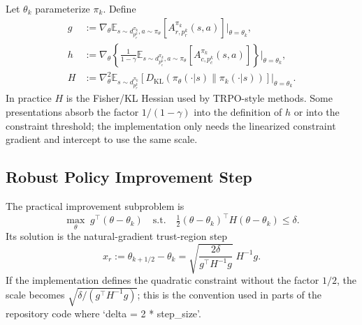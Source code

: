 \documentclass[11pt]{article}
\newcommand{\E}{\mathbb E}
\newcommand{\KL}{D_{\mathrm{KL}}}
\newcommand{\half}{\tfrac12}
\begin{document}
Let $\theta_k$ parameterize $\pi_k$.  Define
\begin{align}
    g &:= \nabla_\theta
    \E_{s\sim d_{p_r^k}^{\pi_k},a\sim\pi_\theta}
    \left[A^{\pi_k}_{r,p_r^k}(s,a)\right]\Big|_{\theta=\theta_k},
    \label{eq:g-def}\\
    h &:= \nabla_\theta
    \left\{\frac{1}{1-\gamma}\E_{s\sim d_{p_c^k}^{\pi_k},a\sim\pi_\theta}
    \left[A^{\pi_k}_{c,p_c^k}(s,a)\right]\right\}\Big|_{\theta=\theta_k},
    \label{eq:h-def}\\
    H &:= \nabla_\theta^2
    \E_{s\sim d_{p_r^k}^{\pi_k}}
    \left[\KL(\pi_\theta(\cdot|s)\|\pi_k(\cdot|s))\right]\Big|_{\theta=\theta_k}.
    \label{eq:H-def}
\end{align}
In practice $H$ is the Fisher/KL Hessian used by TRPO-style methods.  Some presentations absorb the factor $1/(1-\gamma)$ into the definition of $h$ or into the constraint threshold; the implementation only needs the linearized constraint gradient and intercept to use the same scale.

\subsection{Robust Policy Improvement Step}
The practical improvement subproblem is
\begin{equation}
    \max_\theta\; g^\top(\theta-\theta_k)
    \quad\text{s.t.}\quad
    \half(\theta-\theta_k)^\top H(\theta-\theta_k)\le\delta.
    \label{eq:practical-improvement}
\end{equation}
Its solution is the natural-gradient trust-region step
\begin{equation}
    x_r := \theta_{k+1/2}-\theta_k
    = \sqrt{\frac{2\delta}{g^\top H^{-1}g}}\;H^{-1}g.
    \label{eq:reward-step}
\end{equation}
If the implementation defines the quadratic constraint without the factor $1/2$, the scale becomes $\sqrt{\delta/(g^\top H^{-1}g)}$; this is the convention used in parts of the repository code where `delta = 2 * step\_size'.
\end{document}
